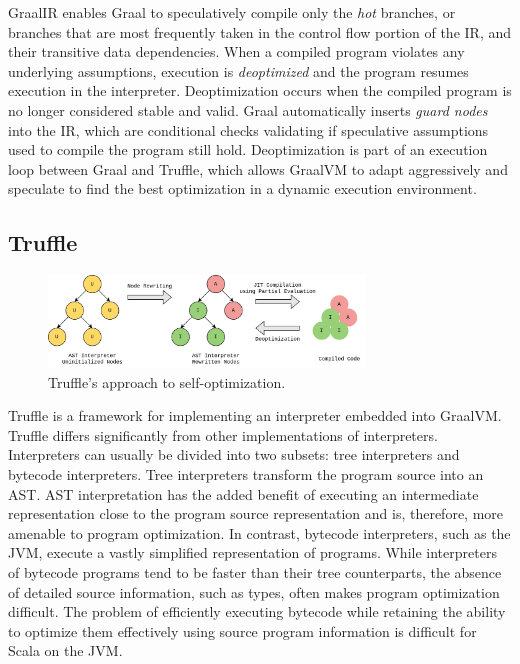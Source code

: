 GraalIR enables Graal to speculatively compile only the \textit{hot} branches\cite{graalvm:speculative-ir}, or branches that are most frequently taken in the control flow portion of the IR, and their transitive data dependencies.
When a compiled program violates any underlying assumptions, execution is \textit{deoptimized}\cite{self:deoptimization} and the program resumes execution in the interpreter.
Deoptimization occurs when the compiled program is no longer considered stable and valid.
Graal automatically inserts \textit{guard nodes} into the IR, which are conditional checks validating if speculative assumptions used to compile the program still hold.
Deoptimization is part of an execution loop between Graal and Truffle, which allows GraalVM to adapt aggressively and speculate to find the best optimization in a dynamic execution environment.

\subsection{Truffle}

\begin{figure}[!htb]
	\centering
	\includegraphics[width=0.75\textwidth]{figures/truffle-loop.png}
	\caption{Truffle's approach to self-optimization\cite{truffle:thesis}.}
	\label{diagram:graal-loop}
\end{figure}

Truffle is a framework for implementing an interpreter embedded into GraalVM.
Truffle differs significantly from other implementations of interpreters.
Interpreters can usually be divided into two subsets: tree interpreters and bytecode interpreters.
Tree interpreters transform the program source into an AST. 
AST interpretation has the added benefit of executing an intermediate representation close to the program source representation and is, therefore, more amenable to program optimization.
In contrast, bytecode interpreters, such as the JVM, execute a vastly simplified representation of programs.
While interpreters of bytecode programs tend to be faster than their tree counterparts, the absence of detailed source information, such as types, often makes program optimization difficult.
The problem of efficiently executing bytecode while retaining the ability to optimize them effectively using source program information is difficult for Scala on the JVM. 

